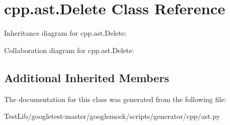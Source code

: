 \hypertarget{classcpp_1_1ast_1_1Delete}{}\section{cpp.\+ast.\+Delete Class Reference}
\label{classcpp_1_1ast_1_1Delete}


Inheritance diagram for cpp.\+ast.\+Delete\+:


Collaboration diagram for cpp.\+ast.\+Delete\+:
\subsection*{Additional Inherited Members}


The documentation for this class was generated from the following file\+:\begin{DoxyCompactItemize}
\item 
Test\+Lib/googletest-\/master/googlemock/scripts/generator/cpp/ast.\+py\end{DoxyCompactItemize}
